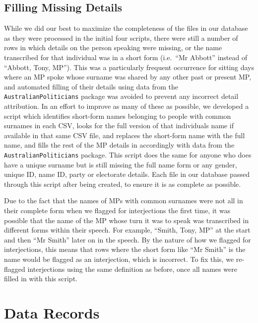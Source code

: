 \documentclass[
  letterpaper,
  DIV=11,
  numbers=noendperiod]{scrartcl}
\begin{document}
\hypertarget{filling-missing-details}{%
\subsection{Filling Missing Details}\label{filling-missing-details}}

While we did our best to maximize the completeness of the files in our
database as they were processed in the initial four scripts, there were
still a number of rows in which details on the person speaking were
missing, or the name transcribed for that individual was in a short form
(i.e.~``Mr Abbott'' instead of ``Abbott, Tony, MP''). This was a
particularly frequent occurrence for sitting days where an MP spoke
whose surname was shared by any other past or present MP, and automated
filling of their details using data from the
\texttt{AustralianPoliticians} package was avoided to prevent any
incorrect detail attribution. In an effort to improve as many of these
as possible, we developed a script which identifies short-form names
belonging to people with common surnames in each CSV, looks for the full
version of that individuals name if available in that same CSV file, and
replaces the short-form name with the full name, and fills the rest of
the MP details in accordingly with data from the
\texttt{AustralianPoliticians} package. This script does the same for
anyone who does have a unique surname but is still missing the full name
form or any gender, unique ID, name ID, party or electorate details.
Each file in our database passed through this script after being
created, to ensure it is as complete as possible.

Due to the fact that the names of MPs with common surnames were not all
in their complete form when we flagged for interjections the first time,
it was possible that the name of the MP whose turn it was to speak was
transcribed in different forms within their speech. For example,
``Smith, Tony, MP'' at the start and then ``Mr Smith'' later on in the
speech. By the nature of how we flagged for interjections, this means
that rows where the short form like ``Mr Smith'' is the name would be
flagged as an interjection, which is incorrect. To fix this, we
re-flagged interjections using the same definition as before, once all
names were filled in with this script.

\hypertarget{data-records}{%
\section{Data Records}\label{data-records}}
\end{document}
